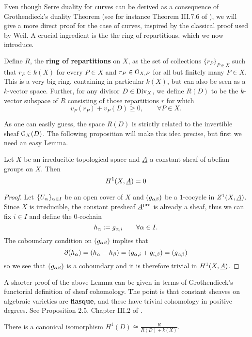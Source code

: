 	Even though Serre duality for curves can be derived as a consequence of Grothendieck's duality Theorem (see for instance Theorem III.7.6 of \cite{HAG}), we will give a more direct proof for the case of curves, inspired by the classical proof used by Weil. A crucial ingredient is the the ring of repartitions, which we now introduce.
	\begin{defi}
		Define $R$, the \textbf{ring of repartitions} on $X$, as the set of collections $\{r_P\}_{P\in X}$ such that $r_P\in k(X)$ for every $P\in X$ and $r_P\in \mathcal{O}_{X,P}$ for all but finitely many $P\in X$. This is a very big ring, containing in particular $k(X)$, but can also be seen as a $k$-vector space.
		Further, for any divisor $D\in \operatorname{Div}_X$, we define $R(D)$ to be the $k$-vector subspace of $R$ consisting of those repartitions $r$ for which
		$$ v_P(r_P) + v_P(D) \geq 0, \qquad \forall P\in X. $$
	\end{defi}
	As one can easily guess, the space $R(D)$ is strictly related to the invertible sheaf $\mathcal{O}_X(D)$. The following proposition will make this idea precise, but first we need an easy Lemma.
	\begin{lemm}\label{lemm:H1}
		Let $X$ be an irreducible topological space and $\underline{A}$ a constant sheaf of abelian groups on $X$. Then
		$$ H^1(X, \underline{A}) = 0 $$
	\end{lemm}
	\begin{proof}
		Let $\{ U_\alpha \}_{\alpha \in I}$ be an open cover of $X$ and $(g_{{\alpha\beta}})$ be a $1$-cocycle in $Z^1(X, \underline{A})$. Since $X$ is irreducible, the constant presheaf $\underline{A}^{\operatorname{pre}}$ is already a sheaf, thus we can fix $i\in I$ and define the $0$-cochain
		$$ h_\alpha := g_{\alpha, i} \qquad \forall \alpha \in I. $$
		The coboundary condition on $(g_{{\alpha\beta}})$ implies that
		$$ \partial (h_\alpha) = (h_\alpha - h_\beta) = (g_{\alpha, i} + g_{i, \beta}) = (g_{{\alpha\beta}}) $$
		so we see that $(g_{{\alpha\beta}})$ is a coboundary and it is therefore trivial in $H^1(X, \underline{A})$.
	\end{proof}
	\begin{rema}
		A shorter proof of the above Lemma can be given in terms of Grothendieck's functorial definition of sheaf cohomology. The point is that constant sheaves on algebraic varieties are \textbf{flasque}, and these have trivial cohomology in positive degrees. See Proposition $2.5$, Chapter III.2 of \cite{HAG}.
	\end{rema}
	\begin{prop}\label{prop:h1D}
		There is a canonical isomorphism $ H^1(D) \cong \frac{R}{R(D)+k(X)} $.
	\end{prop}
